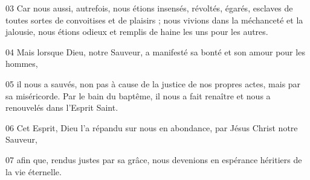 
03 Car nous aussi, autrefois, nous étions insensés, révoltés, égarés, esclaves de toutes sortes de convoitises et de plaisirs ; nous vivions dans la méchanceté et la jalousie, nous étions odieux et remplis de haine les uns pour les autres.

04 Mais lorsque Dieu, notre Sauveur, a manifesté sa bonté et son amour pour les hommes,

05 il nous a sauvés, non pas à cause de la justice de nos propres actes, mais par sa miséricorde. Par le bain du baptême, il nous a fait renaître et nous a renouvelés dans l’Esprit Saint.

06 Cet Esprit, Dieu l’a répandu sur nous en abondance, par Jésus Christ notre Sauveur,

07 afin que, rendus justes par sa grâce, nous devenions en espérance héritiers de la vie éternelle.
